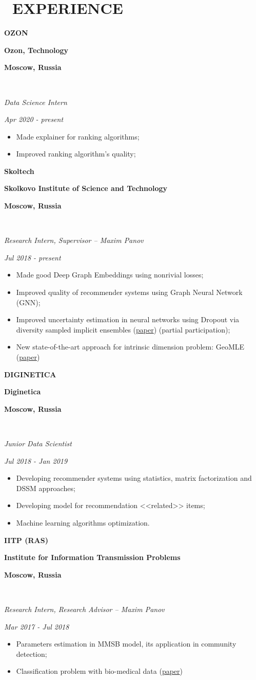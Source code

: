 \documentclass[11pt,a4paper,roman]{moderncv}
\newcommand{\logoOzon}{\textcolor{ozon_blue}{OZON}}
\newcommand{\logoSk}{\textcolor{sk_gray}{Skol}\textcolor{sk_green}{tech}}
\newcommand{\logoDigi}{\textcolor{digi_red}{DIGI}NETICA}
\newcommand{\logoIITP}{\textcolor{iitp_blue}{IITP (RAS)}}
\newcommand*{\cvpublic}[5]{
    \parbox[t]{0.22\textwidth}{\bfseries #1}
    \parbox[t]{0.56\textwidth}{\centering \bfseries #2}
    \parbox[t]{0.22\textwidth}{\hfill {\bfseries #3}}
    \\ \parbox[t]{0.78\textwidth}{\itshape #4}
    \parbox[t]{0.22\textwidth}{\hfill {\itshape #5}}
}
\begin{document}
\section{\faSuitcase~EXPERIENCE}

\cvpublic{\logoOzon}
          {Ozon, Technology}
          {Moscow, Russia}
          {Data Science Intern}
          {Apr 2020 - present}
\begin{itemize}
    \item Made explainer for ranking algorithms;
    \item Improved ranking algorithm's quality;
\end{itemize}
\vspace{5pt}
\cvpublic{\logoSk}
          {Skolkovo Institute of Science and Technology}
          {Moscow, Russia}
          {Research Intern, Supervisor -- Maxim Panov}
          {Jul 2018 - present}
\begin{itemize}
    \item Made good Deep Graph Embeddings using nonrivial losses;
    \item Improved quality of recommender systems using Graph Neural Network (GNN);
    \item Improved uncertainty estimation in neural networks using Dropout via diversity sampled implicit ensembles (\href{https://arxiv.org/abs/2003.03274}{paper}) (partial participation);
    \item New state-of-the-art approach for intrinsic dimension problem: GeoMLE (\href{https://arxiv.org/abs/1904.06151}{paper})
\end{itemize}
\vspace{5pt}
\cvpublic{\logoDigi}
          {Diginetica}
          {Moscow, Russia}
          {Junior Data Scientist}
          {Jul 2018 - Jan 2019}
\begin{itemize}
    \item Developing recommender systems using statistics, matrix factorization and DSSM approaches;
    \item Developing model for recommendation <<related>> items; 
    \item Machine learning algorithms optimization.
\end{itemize}
\vspace{5pt}

\cvpublic{\logoIITP}
          {Institute for Information Transmission Problems}
          {Moscow, Russia}
          {Research Intern, Research Advisor -- Maxim Panov}
          {Mar 2017 - Jul 2018}
\begin{itemize}
    \item Parameters estimation in MMSB model, its application in community detection;
    \item Classification problem with bio-medical data (\href{https://arxiv.org/pdf/1710.05213.pdf}{paper})
\end{itemize}
\end{document}
